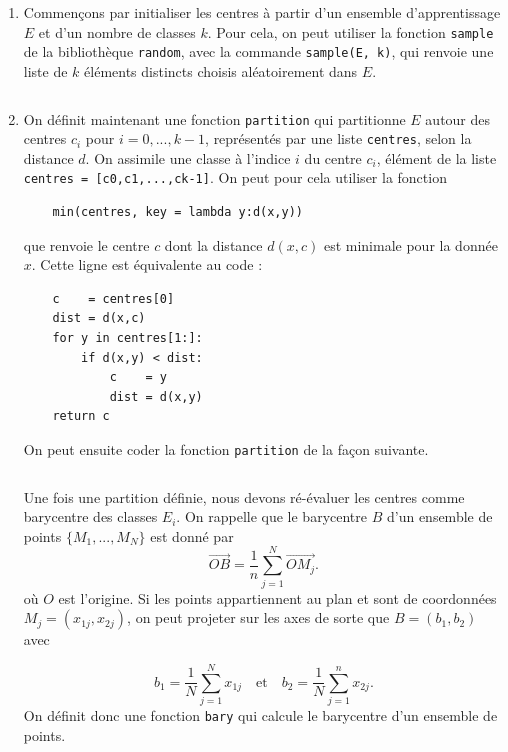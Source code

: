\documentclass[12pt,fancy]{cours}
\begin{document}
\begin{enumerate}
    \item 
Commençons par initialiser les centres à partir d’un ensemble d’apprentissage $E$ et d’un nombre de classes $k$. Pour cela, on peut utiliser la fonction \texttt{sample} de la bibliothèque \texttt{random}, avec la commande \texttt{sample(E, k)}, qui renvoie une liste de $k$ éléments distincts choisis aléatoirement dans $E$.

\inputminted{python}{./code/centres.py}
\item
    On définit maintenant une fonction \texttt{partition} qui partitionne $E$ autour des centres $c_i$ pour $i=0,...,k-1$, représentés par une liste \texttt{centres}, selon la distance $d$. On assimile une classe à l’indice $i$ du centre $c_i$, élément de la liste \texttt{centres = [c0,c1,...,ck-1]}. On peut pour cela utiliser la fonction 
    \begin{verbatim}
    min(centres, key = lambda y:d(x,y))
    \end{verbatim}
    que renvoie le centre $c$ dont la distance $d(x,c)$ est minimale pour la donnée $x$. Cette ligne est équivalente au code :
    \begin{verbatim}
    c    = centres[0]
    dist = d(x,c)
    for y in centres[1:]:
        if d(x,y) < dist:
            c    = y
            dist = d(x,y)
    return c
    \end{verbatim}
    On peut ensuite coder la fonction \texttt{partition} de la façon suivante.
    \inputminted{python}{./code/partition.py}
    
     Une fois une partition définie, nous devons ré-évaluer les centres comme barycentre des classes $E_i$. On rappelle que le barycentre $B$ d'un ensemble de points $\{M_1,...,M_N\}$ est donné par 
     \begin{equation}
        \Vec{OB} = \frac{1}{n}\sum_{j = 1}^N \Vec{OM_j}.
    \end{equation}
     où $O$ est l'origine. Si les points appartiennent au plan et sont de coordonnées $M_j=(x_{1j},x_{2j})$, on peut projeter sur les axes de sorte que $B = (b_1,b_2)$ avec
     
        \begin{equation}
            b_1 = \frac{1}{N}\sum_{j = 1}^N x_{1j} \quad \text{et} \quad b_2 = \frac{1}{N}\sum_{j = 1}^n x_{2j}.
        \end{equation}
      On définit donc une fonction \texttt{bary} qui calcule le barycentre d’un ensemble de points.
    \inputminted{python}{./code/eval_centres.py}
\end{enumerate}
\end{document}
